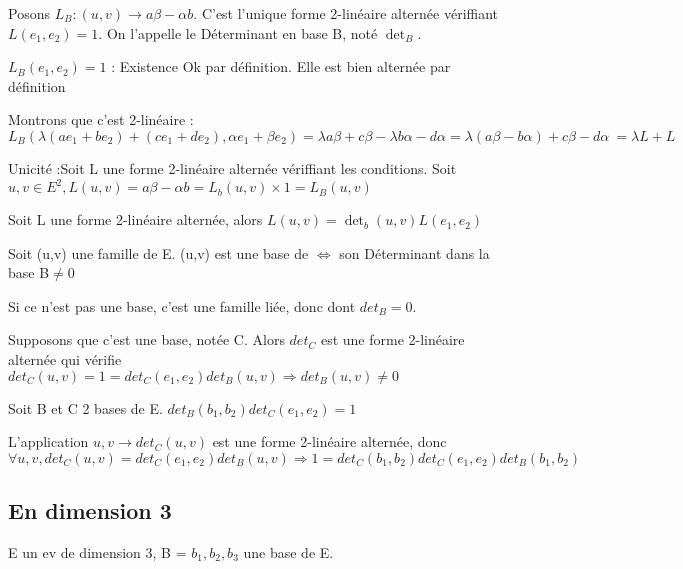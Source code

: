\documentclass[french]{yLectureNote}
\begin{document}
\begin{definition}

Posons \(L_B : (u,v) \to a\beta -\alpha b\). C'est l'unique forme 2-linéaire alternée vériffiant \(L(e_1,e_2) = 1\). On l'appelle le Déterminant en base B, noté \(\det_B\).
\end{definition}
\begin{myproof}
 \(L_B(e_1,e_2) = 1\) : Existence Ok par définition. Elle est bien alternée par définition

Montrons que c'est 2-linéaire : \(L_B(\lambda(ae_1+be_2)+(ce_1+de_2), \alpha e_1+\beta e_2) = \lambda a \beta + c\beta -\lambda b\alpha -d\alpha = \lambda(a\beta -b\alpha)+c\beta-d\alpha\ = \lambda L + L\)

Unicité :Soit L une forme 2-linéaire alternée vériffiant les conditions. Soit \(u,v\in E^2, L(u,v) = a\beta-\alpha b = L_b(u,v) \times 1  = L_B(u,v)\)
\end{myproof}
\begin{proposition}
Soit L une forme 2-linéaire alternée, alors \(L(u,v) = \det_b(u,v)L(e_1,e_2)\)
\end{proposition}
\begin{proposition}
Soit (u,v) une famille de E. (u,v) est une base de \(\iff\) son Déterminant dans la base B\(\neq 0\)
\end{proposition}
\begin{myproof}
 Si ce n'est pas une base, c'est une famille liée, donc dont \(det_B = 0\).

 Supposons que c'est une base, notée C. Alors \(det_C\) est une forme 2-linéaire alternée qui vérifie \(det_C(u,v) = 1 = det_C(e_1,e_2)det_B(u,v) \Rightarrow det_B(u,v)\neq 0\)
\end{myproof}
\begin{proposition}
Soit B et C 2 bases de E. \(det_B(b_1,b_2)det_C(e_1,e_2) = 1\)
\end{proposition}
\begin{myproof}
 L'application \(u,v \to det_C(u,v)\) est une forme 2-linéaire alternée, donc \(\forall u,v, det_C(u,v) = det_C(e_1,e_2)det_B(u,v) \Rightarrow 1 = det_C(b_1,b_2)det_C(e_1,e_2)det_B(b_1,b_2)\)
\end{myproof}
\subsection{En dimension 3}
E un ev de dimension 3, B = \(b_1,b_2,b_3\) une base de E.
\end{document}
